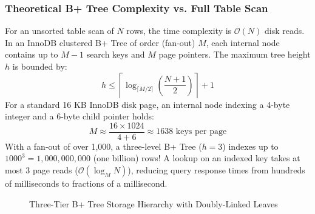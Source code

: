 \documentclass[11pt,a4paper]{report}
\begin{document}
\subsubsection{Theoretical B+ Tree Complexity vs. Full Table Scan}
For an unsorted table scan of $N$ rows, the time complexity is $\mathcal{O}(N)$ disk reads. In an InnoDB clustered B+ Tree of order (fan-out) $M$, each internal node contains up to $M-1$ search keys and $M$ page pointers. The maximum tree height $h$ is bounded by:
\begin{equation}
    h \le \left\lceil \log_{\lceil M/2 \rceil} \left( \frac{N+1}{2} \right) \right\rceil + 1
\end{equation}
For a standard 16 KB InnoDB disk page, an internal node indexing a 4-byte integer and a 6-byte child pointer holds:
\begin{equation}
    M \approx \frac{16 \times 1024}{4 + 6} \approx 1638 \text{ keys per page}
\end{equation}
With a fan-out of over 1,000, a three-level B+ Tree ($h=3$) indexes up to $1000^3 = 1,000,000,000$ (one billion) rows! A lookup on an indexed key takes at most 3 page reads ($\mathcal{O}(\log_M N)$), reducing query response times from hundreds of milliseconds to fractions of a millisecond.

\begin{figure}[H]
    \centering
    \caption{Three-Tier B+ Tree Storage Hierarchy with Doubly-Linked Leaves}
    \label{fig:btree_structure}
\end{figure}
\end{document}
